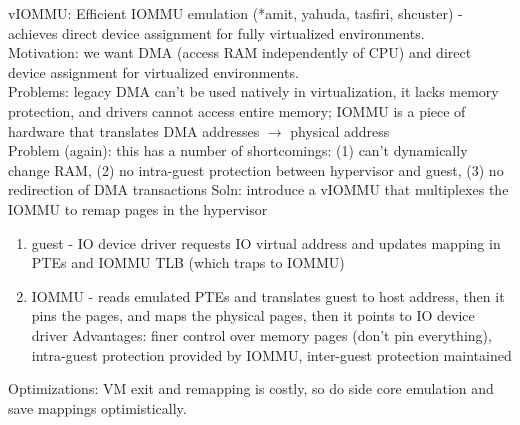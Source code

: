 \documentclass{article}
\begin{document}

\noindent\cite{nadav:atc2011-viommu} vIOMMU: Efficient IOMMU emulation (*amit, yahuda, tasfiri, shcuster) - achieves direct device assignment for fully virtualized environments. \\
Motivation: we want DMA (access RAM independently of CPU) and direct device assignment for virtualized environments.\\
Problems: legacy DMA can't be used natively in virtualization, it lacks memory protection, and drivers cannot access entire memory; IOMMU is a piece of hardware that translates DMA addresses \(\rightarrow\) physical address\\
Problem (again): this has a number of shortcomings: (1) can't dynamically change RAM,  (2) no intra-guest protection between hypervisor and guest, (3) no redirection of DMA transactions
Soln: introduce a vIOMMU that multiplexes the IOMMU to remap pages in the hypervisor
\begin{enumerate}
	\item guest - IO device driver requests IO virtual address and updates mapping in PTEs and IOMMU TLB (which traps to IOMMU)
	\item IOMMU - reads emulated PTEs and translates guest to host address, then it pins the pages, and maps the physical pages, then it points to IO device driver
Advantages: finer control over memory pages (don't pin everything), intra-guest protection provided by IOMMU, inter-guest protection maintained
\end{enumerate}
Optimizations: VM exit and remapping is costly, so do side core emulation and save mappings optimistically. 
\end{document}
